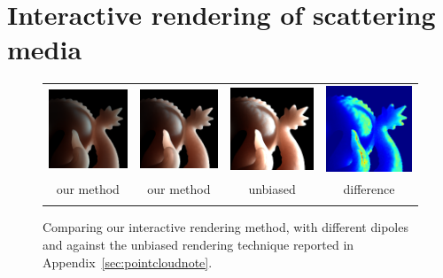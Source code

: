 \section{Interactive rendering of scattering media}
\label{sec:interactivedirssscontribution}
%
\begin{figure}[t]
\begin{tabular}{@{}c@{}c@{}c@{}c@{}}
\includegraphics[width=0.27\columnwidth]{figures/difference/dragon_shampoo_jensen} &
\includegraphics[width=0.27\columnwidth]{figures/difference/diff_dr_ours_small} &
\includegraphics[width=0.27\columnwidth]{figures/difference/diff_dr_ref_small} &
\includegraphics[width=0.27\columnwidth]{figures/difference/diff_dr_diff_small} \\ 
our method & our method & unbiased & difference  \\
\cite{Jensen2001} & \cite{Frisvad2014} & \cite{Frisvad2014} &  \\
\end{tabular}
\caption{Comparing our interactive rendering method, with different dipoles and against the unbiased rendering technique reported in Appendix~\ref{sec:pointcloudnote}.}
\label{fig:interactivediff}
\end{figure}
